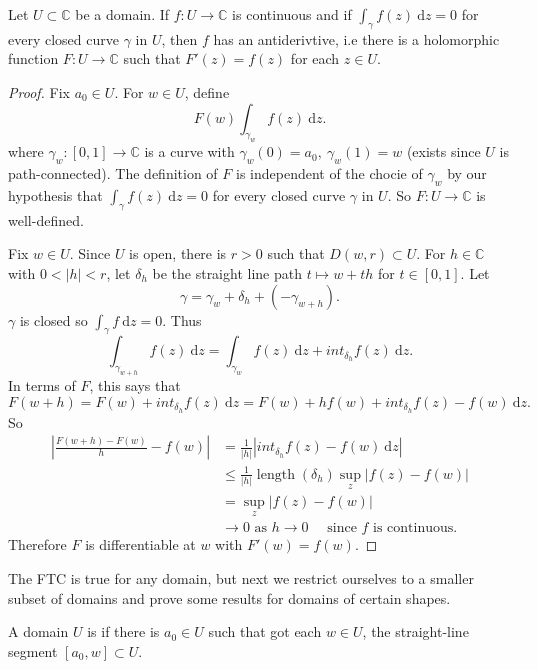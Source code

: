 \documentclass[a4paper]{scrartcl}
\begin{document}
\begin{theorem}\label{ftcconverse}
      Let $U \subset \mathbb{C}$ be a domain. If $f: U \rightarrow \mathbb{C}$ is continuous and if $\int_{\gamma}^{}f (z) \ \mathrm{d}z =0$ for every closed curve $\gamma$ in $U$, then $f$ has an antiderivtive, i.e there is a holomorphic function $F: U \rightarrow \mathbb{C}$ such that $F' (z)=f (z)$ for each $z \in U$.
\end{theorem}
\begin{proof}
      Fix $a_0 \in U$. For $w \in U$, define \[
      F (w) \int_{\gamma_{w}}^{}f (z) \ \mathrm{d}z 
      .\] where $\gamma_{w}: [0,1] \rightarrow \mathbb{C}$ is a curve with $\gamma_{w} (0)=a_0 , \ \gamma_{w}(1)=w$ (exists since $U$ is path-connected). The definition of $F$ is independent of the chocie of $\gamma_{w}$ by our hypothesis that $\int_{\gamma}^{}f (z) \ \mathrm{d}z =0$ for every closed curve $\gamma$ in $U$. So $F: U \rightarrow \mathbb{C}$ is well-defined.

      Fix $w \in U$. Since $U$ is open, there is $r>0$ such that $D (w,r) \subset  U$. For $h \in \mathbb{C}$ with $0 < |h|<r$, let $\delta_{h}$ be the straight line path $t \mapsto w+th$ for $t \in [0,1]$. Let \[
      \gamma= \gamma_{w}+\delta_{h}+ (-\gamma_{w+h})
      .\] $\gamma$ is closed so $\int_{\gamma}^{}f \ \mathrm{d}z=0 $. Thus \[
      \int_{\gamma_{w+h}}^{}f (z) \ \mathrm{d}z =\int_{\gamma_{w}}^{}f (z) \ \mathrm{d}z +int_{\delta_{h}}^{}f (z) \ \mathrm{d}z 
      .\] In terms of $F$, this says that \[
     F (w+h)=F (w)+int_{\delta_{h}}^{}f (z) \ \mathrm{d}z =F (w)+ h f (w)+int_{\delta_{h}}^{}f (z)-f (w) \ \mathrm{d}z 
      .\] So 
      \begin{align*}
           \left| \frac{F (w+h)-F (w)}{h}- f (w)\right| &= \frac{1}{|h|}|int_{\delta_{h}}^{}f (z)-f (w) \ \mathrm{d}z |\\
           &\leq \frac{1}{|h|}\operatorname{length}(\delta_{h})\sup_{z}|f (z)-f (w)|\\
           &=\sup_{z}|f (z)-f (w)|\\
           & \rightarrow 0 \text{ as } h \rightarrow 0 \quad \text{ since } f \text{ is continuous.}
      \end{align*}
      Therefore $F$ is differentiable at $w$ with $F' (w)=f (w)$.
\end{proof}
The FTC is true for any domain, but next we restrict ourselves to a smaller subset of domains and prove some results for domains of certain shapes.
\begin{definition*}
      A domain $U$ is  if there is $a_0 \in U$ such that got each $w \in U$, the straight-line segment $[a_0 ,w] \subset U$.
\end{definition*}
\end{document}
